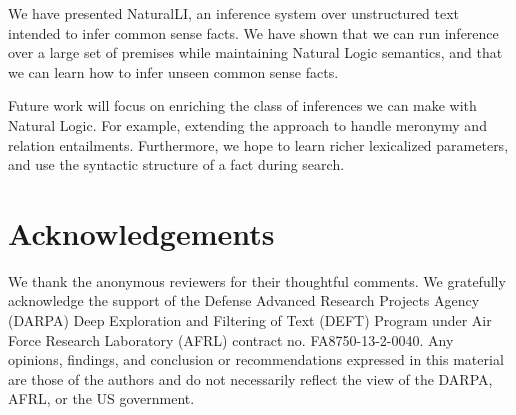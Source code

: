 We have presented NaturalLI, an inference system over
  unstructured text intended to infer common sense facts.
We have shown that we can run inference over a large set of premises
  while maintaining Natural Logic semantics, and that
  we can learn how to infer unseen common sense facts.

Future work will focus on enriching the class of inferences we can
  make with Natural Logic.
For example, extending the approach to handle meronymy and
  relation entailments.
Furthermore, we hope to learn richer lexicalized parameters,
  and use the syntactic structure of a fact during search.

\section*{Acknowledgements}
We thank the anonymous reviewers for their thoughtful comments.
We gratefully acknowledge the support of the Defense
Advanced Research Projects Agency (DARPA) Deep Exploration and Filtering
of Text (DEFT) Program under Air Force Research Laboratory (AFRL)
contract no. FA8750-13-2-0040. Any opinions, findings, and conclusion or
recommendations expressed in this material are those of the authors and
do not necessarily reflect the view of the DARPA, AFRL, or the US
government.
